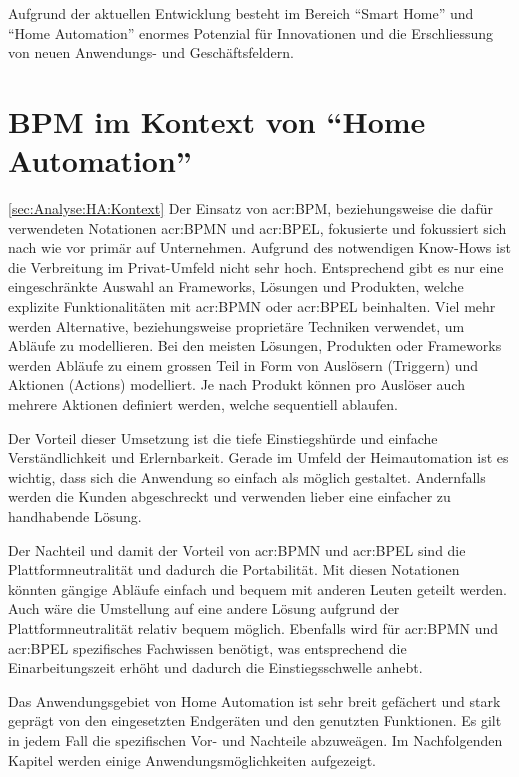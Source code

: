 Aufgrund der aktuellen Entwicklung besteht im Bereich "`Smart Home"' und "`Home Automation"' enormes Potenzial für Innovationen und die Erschliessung von neuen Anwendungs- und Geschäftsfeldern. 

\section{BPM im Kontext von "`Home Automation"'}\ref{sec:Analyse:HA:Kontext}
Der Einsatz von \gls{acr:BPM}, beziehungsweise die dafür verwendeten Notationen \gls{acr:BPMN} und \gls{acr:BPEL}, fokusierte und fokussiert sich nach wie vor primär auf Unternehmen. Aufgrund des notwendigen Know-Hows ist die Verbreitung im Privat-Umfeld nicht sehr hoch. Entsprechend gibt es nur eine eingeschränkte Auswahl an Frameworks, Lösungen und Produkten, welche explizite Funktionalitäten mit \gls{acr:BPMN} oder \gls{acr:BPEL} beinhalten. Viel mehr werden Alternative, beziehungsweise proprietäre Techniken verwendet, um Abläufe zu modellieren. Bei den meisten Lösungen, Produkten oder Frameworks werden Abläufe zu einem grossen Teil in Form von Auslösern (Triggern) und Aktionen (Actions) modelliert. Je nach Produkt können pro Auslöser auch mehrere Aktionen definiert werden, welche sequentiell ablaufen.

Der Vorteil dieser Umsetzung ist die tiefe Einstiegshürde und einfache Verständlichkeit und Erlernbarkeit. Gerade im Umfeld der Heimautomation ist es wichtig, dass sich die Anwendung so einfach als möglich gestaltet. Andernfalls werden die Kunden abgeschreckt und verwenden lieber eine einfacher zu handhabende Lösung.

Der Nachteil und damit der Vorteil von \gls{acr:BPMN} und \gls{acr:BPEL} sind die Plattformneutralität und dadurch die Portabilität. Mit diesen Notationen könnten gängige Abläufe einfach und bequem mit anderen Leuten geteilt werden. Auch wäre die Umstellung auf eine andere Lösung aufgrund der Plattformneutralität relativ bequem möglich. Ebenfalls wird für \gls{acr:BPMN} und \gls{acr:BPEL} spezifisches Fachwissen benötigt, was entsprechend die Einarbeitungszeit erhöht und dadurch die Einstiegsschwelle anhebt.

Das Anwendungsgebiet von Home Automation ist sehr breit gefächert und stark geprägt von den eingesetzten Endgeräten und den genutzten Funktionen. Es gilt in jedem Fall die spezifischen Vor- und Nachteile abzuweägen. Im Nachfolgenden Kapitel werden einige Anwendungsmöglichkeiten aufgezeigt.


